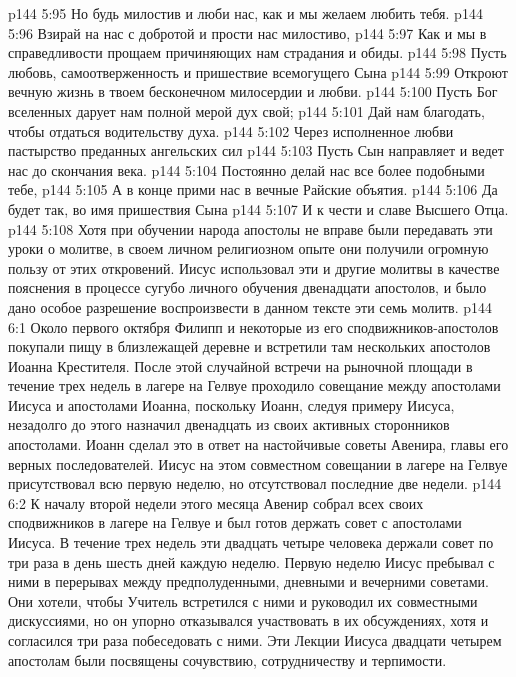\vs p144 5:95 \hsetoff Но будь милостив и люби нас, как и мы желаем любить тебя.
\vs p144 5:96 Взирай на нас с добротой и прости нас милостиво,
\vs p144 5:97 \hsetoff Как и мы в справедливости прощаем причиняющих нам страдания и обиды.
\vs p144 5:98 Пусть любовь, самоотверженность и пришествие всемогущего Сына
\vs p144 5:99 \hsetoff Откроют вечную жизнь в твоем бесконечном милосердии и любви.
\vs p144 5:100 Пусть Бог вселенных дарует нам полной мерой дух свой;
\vs p144 5:101 \hsetoff Дай нам благодать, чтобы отдаться водительству духа.
\vs p144 5:102 Через исполненное любви пастырство преданных ангельских сил
\vs p144 5:103 \hsetoff Пусть Сын направляет и ведет нас до скончания века.
\vs p144 5:104 Постоянно делай нас все более подобными тебе,
\vs p144 5:105 \hsetoff А в конце прими нас в вечные Райские объятия.
\vs p144 5:106 Да будет так, во имя пришествия Сына
\vs p144 5:107 \hsetoff И к чести и славе Высшего Отца.
\vsetoff
\vs p144 5:108 Хотя при обучении народа апостолы не вправе были передавать эти уроки о молитве, в своем личном религиозном опыте они получили огромную пользу от этих откровений. Иисус использовал эти и другие молитвы в качестве пояснения в процессе сугубо личного обучения двенадцати апостолов, и было дано особое разрешение воспроизвести в данном тексте эти семь молитв.
\vs p144 6:1 Около первого октября Филипп и некоторые из его сподвижников\hyp{}апостолов покупали пищу в близлежащей деревне и встретили там нескольких апостолов Иоанна Крестителя. После этой случайной встречи на рыночной площади в течение трех недель в лагере на Гелвуе проходило совещание между апостолами Иисуса и апостолами Иоанна, поскольку Иоанн, следуя примеру Иисуса, незадолго до этого назначил двенадцать из своих активных сторонников апостолами. Иоанн сделал это в ответ на настойчивые советы Авенира, главы его верных последователей. Иисус на этом совместном совещании в лагере на Гелвуе присутствовал всю первую неделю, но отсутствовал последние две недели.
\vs p144 6:2 К началу второй недели этого месяца Авенир собрал всех своих сподвижников в лагере на Гелвуе и был готов держать совет с апостолами Иисуса. В течение трех недель эти двадцать четыре человека держали совет по три раза в день шесть дней каждую неделю. Первую неделю Иисус пребывал с ними в перерывах между предполуденными, дневными и вечерними советами. Они хотели, чтобы Учитель встретился с ними и руководил их совместными дискуссиями, но он упорно отказывался участвовать в их обсуждениях, хотя и согласился три раза побеседовать с ними. Эти Лекции Иисуса двадцати четырем апостолам были посвящены сочувствию, сотрудничеству и терпимости.
